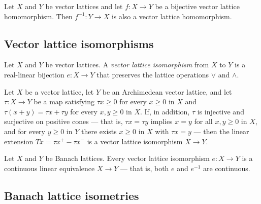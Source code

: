 \begin{lemma}
\label{lem:vecLatHom-symm}
\leanok
{}
Let $X$ and $Y$ be vector lattices and let $f \colon X \to Y$ be a
bijective vector lattice homomorphism. Then $f^{-1} \colon Y \to
X$ is also a vector lattice homomorphism.
\end{lemma}

\subsection{Vector lattice isomorphisms}

\begin{definition}
\label{def:vecLatEquiv}
\leanok
{}
Let $X$ and $Y$ be vector lattices. A \emph{vector lattice
isomorphism} from $X$ to $Y$ is a real-linear bijection $e \colon
X \to Y$ that preserves the lattice operations $\vee$ and
$\wedge$.
\end{definition}

\begin{theorem}
\label{thm:positive-extensionEquiv}
\leanok
{}
Let $X$ be a vector lattice, let $Y$ be an Archimedean vector
lattice, and let $\tau \colon X \to Y$ be a map satisfying $\tau x
\ge 0$ for every $x \ge 0$ in $X$ and $\tau (x + y) = \tau x +
\tau y$ for every $x, y \ge 0$ in $X$. If, in addition, $\tau$ is
injective and surjective on positive cones — that is, $\tau x =
\tau y$ implies $x = y$ for all $x, y \ge 0$ in $X$, and for every
$y \ge 0$ in $Y$ there exists $x \ge 0$ in $X$ with $\tau x = y$ —
then the linear extension $T x = \tau x^{+} - \tau x^{-}$ is a
vector lattice isomorphism $X \to Y$.
\end{theorem}

\begin{theorem}
\label{thm:vecLatEquiv-toContinuousLinearEquiv}
\leanok
{}
Let $X$ and $Y$ be Banach lattices. Every vector lattice
isomorphism $e \colon X \to Y$ is a continuous linear equivalence
$X \to Y$ — that is, both $e$ and $e^{-1}$ are continuous.
\end{theorem}

\subsection{Banach lattice isometries}


